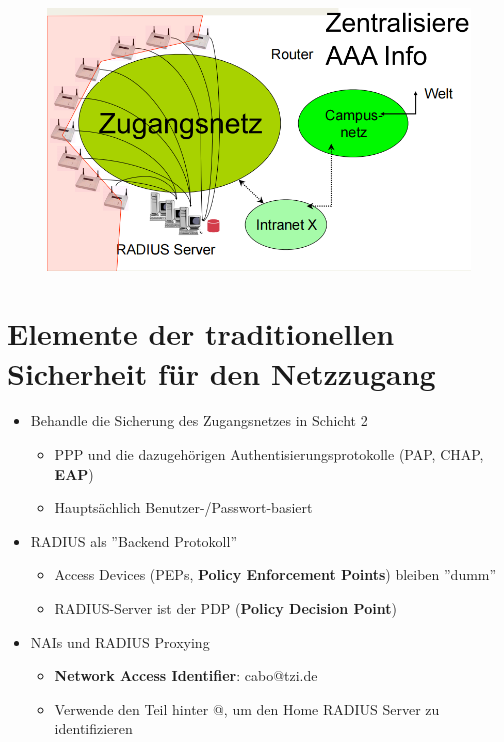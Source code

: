 \documentclass[openany]{book}
\begin{document}
\newpage

\begin{figure}[h!]
    \centering
    \includegraphics[width=0.85\linewidth]{Pics/CentralisedAAA.PNG}
\end{figure}

\section{Elemente der traditionellen Sicherheit für den Netzzugang}

\begin{itemize}
    \item Behandle die Sicherung des Zugangsnetzes in Schicht 2
    \begin{itemize}
        \item PPP und die dazugehörigen Authentisierungsprotokolle (PAP, CHAP, \textbf{EAP})
        \item Hauptsächlich Benutzer-/Passwort-basiert
    \end{itemize}
    \item RADIUS als ''Backend Protokoll''
    \begin{itemize}
        \item Access Devices (PEPs, \textbf{Policy Enforcement Points}) bleiben ''dumm''
        \item RADIUS-Server ist der PDP (\textbf{Policy Decision Point})
    \end{itemize}
    \item NAIs und RADIUS Proxying
    \begin{itemize}
        \item \textbf{Network Access Identifier}: cabo@tzi.de
        \item Verwende den Teil hinter @, um den Home RADIUS Server zu identifizieren
    \end{itemize}
\end{itemize}
\end{document}
